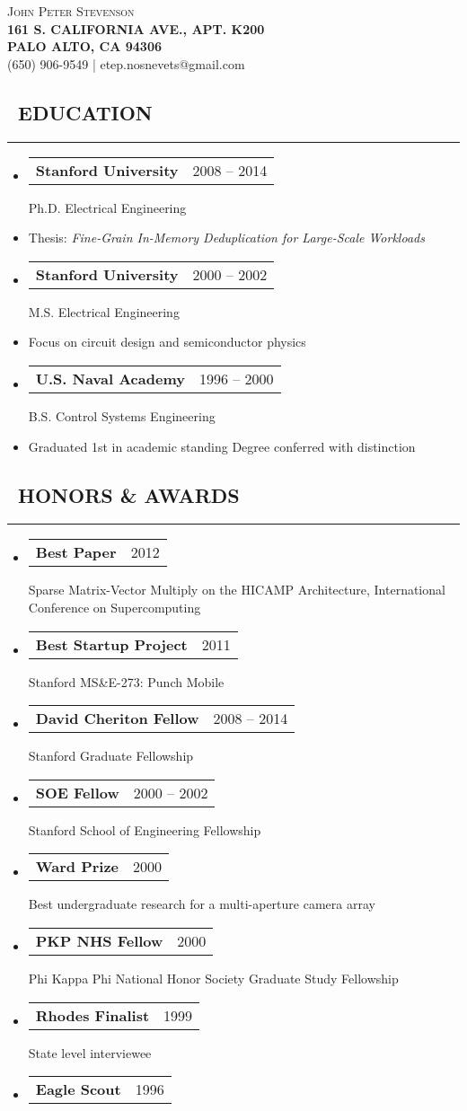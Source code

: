 \documentclass[10pt,letterpaper]{article}
\makeatletter
\newenvironment{resumesection}[1]
{%
    \subsection*{\ \textcolor{light-gray}{#1} }
    \vspace{-0.4em}
    \begin{samepage}
    \hrule
    \end{samepage}
    \vspace{+0.4em}
    \begin{itemize}[leftmargin=0.15cm]
        \parskip=0.1em
}%
{%
    \end{itemize}
}%
\newcommand{\myitem}[1] {
    \item[] \textcolor{dark-gray}{#1}
}
\newcommand{\headertri}[3] {
    \item[] \begin{tabular*}{\linewidth}{l@{\extracolsep{\fill}}r}
    \textbf{#1} & #2 \\
    \end{tabular*}
    #3
}
\newcommand{\lminiw}{0.375}
\makeatother
\begin{document}
\begin{center}
{\huge{ \textsc{ { {{\mdseries John Peter}} {Stevenson} }}}} \\
\vspace{0.5em}
\textcolor{light-gray}{
\footnotesize{\textbf{161 S. CALIFORNIA AVE., APT. K200}}  \\
\footnotesize{\textbf{PALO ALTO, CA 94306              }}  \\
\footnotesize{{(650) 906-9549} | {etep.nosnevets@gmail.com}}
}
\end{center}

\begin{minipage}[t]{\lminiw\textwidth}
\begin{resumesection}{EDUCATION}
    \headertri
    {Stanford University}
    {2008 -- 2014}
    {Ph.D. Electrical Engineering}
    \myitem
    {Thesis: \textit{Fine-Grain In-Memory Deduplication for Large-Scale Workloads}}
    
    \headertri
    {Stanford University}
    {2000 -- 2002}
    {M.S. Electrical Engineering}
    \myitem
    {Focus on circuit design and semiconductor physics}
    
    \headertri
    {U.S. Naval Academy}
    {1996 -- 2000}
    {B.S. Control Systems Engineering}
    \myitem
    {Graduated 1st in academic standing \newline Degree conferred with distinction}
\end{resumesection}

\begin{resumesection}{HONORS \& AWARDS}
    \headertri
    {Best Paper}
    {2012}
    {Sparse Matrix-Vector Multiply on the {{HICAMP}} Architecture, International Conference on Supercomputing}
    
    \headertri
    {Best Startup Project}
    {2011}
    {Stanford MS\&E-273: Punch Mobile}
    
    \headertri
    {David Cheriton Fellow}
    {2008 -- 2014}
    {Stanford Graduate Fellowship}
    
    \headertri
    {SOE Fellow}
    {2000 -- 2002}
    {Stanford School of Engineering Fellowship}
    
    \headertri
    {Ward Prize}
    {2000}
    {Best undergraduate research for a multi-aperture camera array}
    
    \headertri
    {PKP NHS Fellow}
    {2000}
    {Phi Kappa Phi National Honor Society Graduate Study Fellowship}
    
    \headertri
    {Rhodes Finalist}
    {1999}
    {State level interviewee}
    
    \headertri
    {Eagle Scout}
    {1996}
    {}
\end{resumesection}

\end{minipage}
\end{document}
